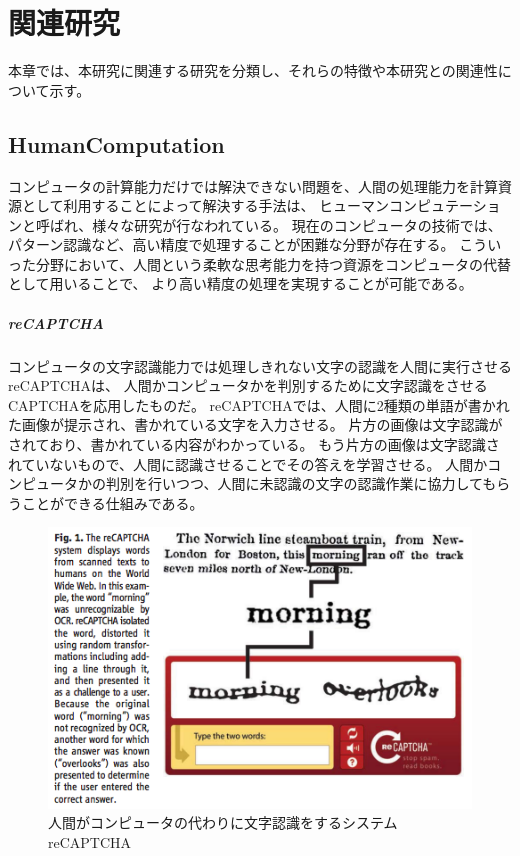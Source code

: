 \chapter{関連研究}\label{chap:related}

本章では、本研究に関連する研究を分類し、それらの特徴や本研究との関連性について示す。

\newpage

\section{HumanComputation}\label{humancomputation}

コンピュータの計算能力だけでは解決できない問題を、人間の処理能力を計算資源として利用することによって解決する手法は、
ヒューマンコンピュテーション\cite{humancomputation}と呼ばれ、様々な研究が行なわれている。
現在のコンピュータの技術では、パターン認識など、高い精度で処理することが困難な分野が存在する。
こういった分野において、人間という柔軟な思考能力を持つ資源をコンピュータの代替として用いることで、
より高い精度の処理を実現することが可能である。

\paragraph{reCAPTCHA}\label{recaptcha}

\mbox{}

コンピュータの文字認識能力では処理しきれない文字の認識を人間に実行させるreCAPTCHA\cite{recaptcha}は、
人間かコンピュータかを判別するために文字認識をさせるCAPTCHA\cite{captcha}を応用したものだ。
reCAPTCHAでは、人間に2種類の単語が書かれた画像が提示され、書かれている文字を入力させる。
片方の画像は文字認識がされており、書かれている内容がわかっている。
もう片方の画像は文字認識されていないもので、人間に認識させることでその答えを学習させる。
人間かコンピュータかの判別を行いつつ、人間に未認識の文字の認識作業に協力してもらうことができる仕組みである。

\begin{figure}[htbp]
  \begin{center}
  \includegraphics[width=.5\linewidth,bb=0 0 476 316]{images/recaptcha.png}
  \end{center}
  \caption{人間がコンピュータの代わりに文字認識をするシステム reCAPTCHA}
  \label{fig:recaptcha}
\end{figure}

